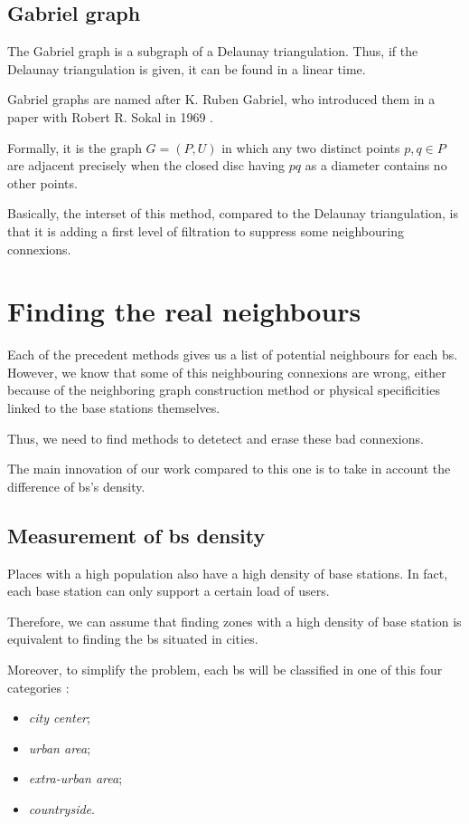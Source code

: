 \documentclass[lettersize,journal,english]{IEEEtran}
\begin{document}
\subsection{Gabriel graph}
\noindent The Gabriel graph is a subgraph of a Delaunay triangulation. Thus, if the Delaunay triangulation is given, it can be found in a linear time. 

Gabriel graphs are named after K. Ruben Gabriel, who introduced them in a paper with Robert R. Sokal in 1969 \cite{10.2307/2412323}.

Formally, it is the graph $G = (P, U)$ in which any two distinct points $p, q \in P$ are adjacent precisely when the closed disc having $pq$ as a diameter contains no other points.

Basically, the interset of this method, compared to the Delaunay triangulation, is that it is adding a first level of filtration to suppress some neighbouring connexions.

\section{Finding the real neighbours}
\noindent Each of the precedent methods gives us a list of potential neighbours for each \acrshort{bs}. However, we know that some of this neighbouring connexions are wrong,
either because of the neighboring graph construction method or physical specificities linked to the base stations themselves.

Thus, we need to find methods to detetect and erase these bad connexions.

The main innovation of our work compared to this one \cite{art_del_paq} is to take in account the difference of \acrshort{bs}'s density.

\subsection{Measurement of \acrshort{bs} density}
\noindent Places with a high population also have a high density of base stations. In fact, each base station can only support a certain
load of users.

Therefore, we can assume that finding zones with a high density of base station is equivalent to finding the \acrshort{bs} 
situated in \og cities\fg{}.

Moreover, to simplify the problem, each \acrshort{bs} will be classified in one of this four categories :
\begin{itemize}
    \item \emph{city center};
    \item \emph{urban area};
    \item \emph{extra-urban area};
    \item \emph{countryside}.
\end{itemize}
\end{document}
